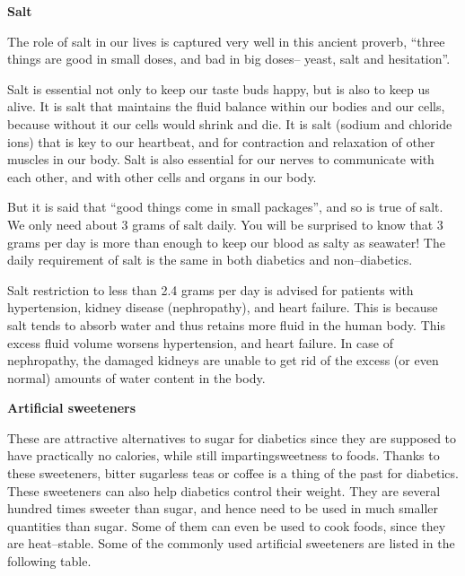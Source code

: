 \noindent\textbf{Salt}

The role of salt in our lives is captured very well in this ancient proverb, “three things are good in small doses, and bad in big doses– yeast, salt and hesitation”.

Salt is essential not only to keep our taste buds happy, but is also to keep us alive. It is salt that maintains the fluid balance within our bodies and our cells, because without it our cells would shrink and die. It is salt (sodium and chloride ions) that is key to our heartbeat, and for contraction and relaxation of other muscles in our body. Salt is also essential for our nerves to communicate with each other, and with other cells and organs in our body.

But it is said that “good things come in small packages”, and so is true of salt. We only need about 3 grams of salt daily. You will be surprised to know that 3 grams per day is more than enough to keep our blood as salty as seawater! The daily requirement of salt is the same in both diabetics and non–diabetics.

Salt restriction to less than 2.4 grams per day is advised for patients with hypertension, kidney disease (nephropathy), and heart failure. This is because salt tends to absorb water and thus retains more fluid in the human body. This excess fluid volume worsens hypertension, and heart failure. In case of nephropathy, the damaged kidneys are unable to get rid of the excess (or even normal) amounts of water content in the body.

\noindent\textbf{Artificial sweeteners}

These are attractive alternatives to sugar for diabetics since they are supposed to have practically no calories, while still imparting\break sweetness to foods. Thanks to these sweeteners, bitter sugarless teas or coffee is a thing of the past for diabetics. These sweeteners can also help diabetics control their weight. They are several hundred times sweeter than sugar, and hence need to be used in much smaller quanti\-ties than sugar. Some of them can even be used to cook foods, since they are heat–stable. Some of the commonly used artificial sweete\-ners are listed in the following table.

